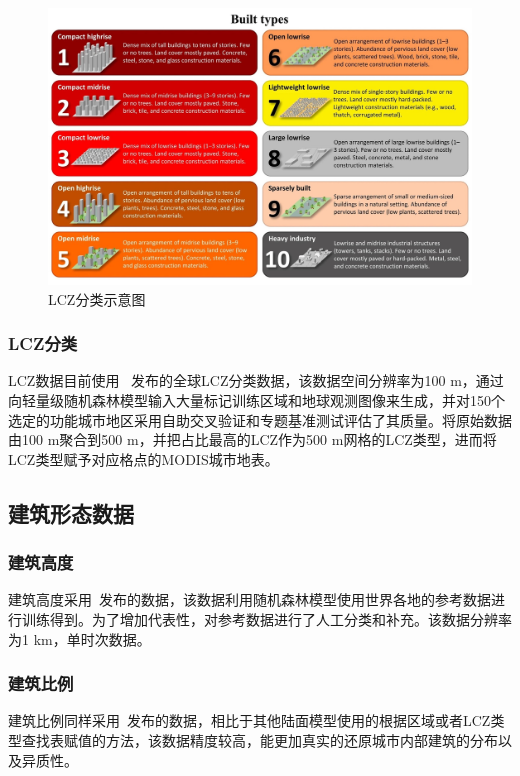 {
  \begin{figure}[htbp]
    \centering
    \includegraphics[width=\textwidth]{Figures/基础数据/LCZ分类图示.jpg}
    \caption{LCZ分类示意图~\citep{demuzere2020combining,stewart2012local}}
    \label{fig:LCZ分类图示}
  \end{figure}
}


\subsubsection{LCZ分类}\label{LCZ分类}
LCZ数据目前使用~\citet{demuzere2022global} 发布的全球LCZ分类数据，该数据空间分辨率为100 m，通过向轻量级随机森林模型输入大量标记训练区域和地球观测图像来生成，并对150个选定的功能城市地区采用自助交叉验证和专题基准测试评估了其质量。将原始数据由100 m聚合到500 m，并把占比最高的LCZ作为500 m网格的LCZ类型，进而将LCZ类型赋予对应格点的MODIS城市地表。


\subsection{建筑形态数据}\label{建筑形态数据}
\subsubsection{建筑高度}\label{建筑高度}
建筑高度采用~\citet{li2022global}发布的数据，该数据利用随机森林模型使用世界各地的参考数据进行训练得到。为了增加代表性，\citet{li2022global}对参考数据进行了人工分类和补充。该数据分辨率为1 km，单时次数据。

\subsubsection{建筑比例}\label{建筑比例}
建筑比例同样采用~\citet{li2022global}发布的数据，相比于其他陆面模型使用的根据区域或者LCZ类型查找表赋值的方法，该数据精度较高，能更加真实的还原城市内部建筑的分布以及异质性。


